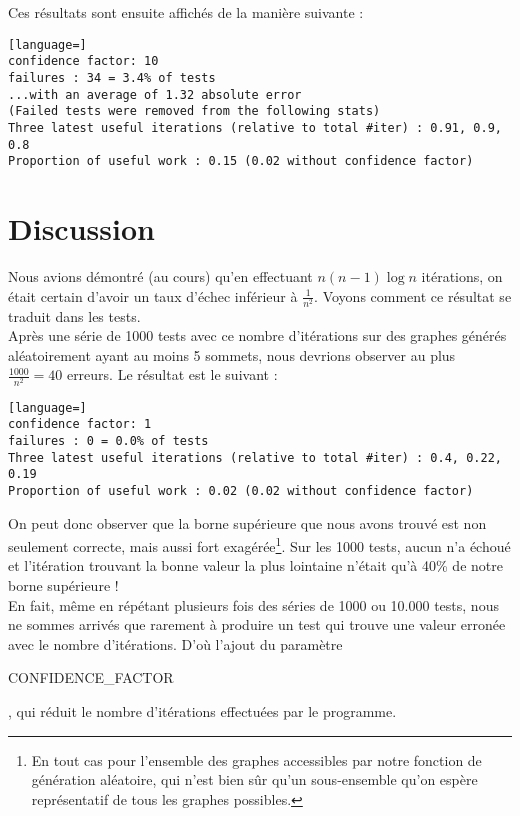 \documentclass[a4paper,10pt]{article}
\begin{document}
Ces résultats sont ensuite affichés de la manière suivante :
\begin{lstlisting}[language=]
confidence factor: 10
failures : 34 = 3.4% of tests
...with an average of 1.32 absolute error
(Failed tests were removed from the following stats)
Three latest useful iterations (relative to total #iter) : 0.91, 0.9, 0.8
Proportion of useful work : 0.15 (0.02 without confidence factor)
\end{lstlisting}
\fontfamily{}

\section {Discussion}

Nous avions démontré (au cours) qu'en effectuant
\begin{math} n(n-1)\log{n} \end{math}
itérations, on était certain d'avoir un taux d'échec inférieur à
\begin{math}\frac{1}{n^{2}} \end{math}. Voyons comment ce résultat se traduit dans les tests.\\

Après une série de 1000 tests avec ce nombre d'itérations sur des graphes générés aléatoirement ayant au moins 5 sommets, nous devrions observer au plus 
\begin{math} \frac{1000}{n^{2}} = 40 \end{math}
erreurs. Le résultat est le suivant :
\begin{lstlisting}[language=]
confidence factor: 1
failures : 0 = 0.0% of tests
Three latest useful iterations (relative to total #iter) : 0.4, 0.22, 0.19
Proportion of useful work : 0.02 (0.02 without confidence factor)
\end{lstlisting}
\fontfamily{}
On peut donc observer que la borne supérieure que nous avons trouvé est non seulement correcte, mais aussi fort
exagérée\footnote{En tout cas pour l'ensemble des graphes accessibles par notre fonction de génération aléatoire, qui n'est bien sûr qu'un sous-ensemble qu'on espère représentatif de tous les graphes possibles.}.
Sur les 1000 tests, aucun n'a échoué et l'itération trouvant la bonne valeur la plus lointaine n'était qu'à 40\% de notre borne supérieure !\\

En fait, même en répétant plusieurs fois des séries de 1000 ou 10.000 tests, nous ne sommes arrivés que rarement à produire un test qui trouve une valeur erronée avec le nombre d'itérations.
D'où l'ajout du paramètre \begin{it}CONFIDENCE\_FACTOR\end{it}, qui réduit le nombre d'itérations effectuées par le programme.\\
\end{document}
